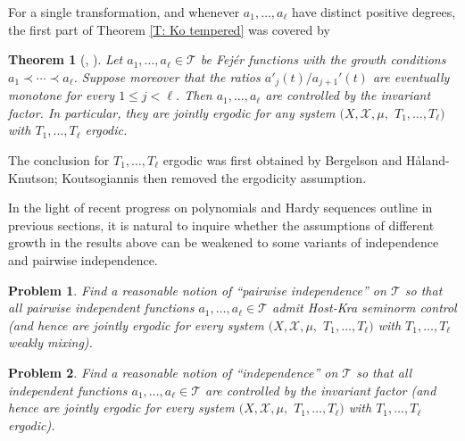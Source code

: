 \documentclass[11pt]{amsart}
\newtheorem{theorem}[lemma]{Theorem}
\newtheorem{problem}{Problem}
\theoremstyle{definition}
\let\ringaccent\r
\def\aa{\ringaccent a}
\def\aa{\ringaccent a}
\newcommand{\CT}{{\mathcal T}}
\newcommand{\CX}{{\mathcal X}}
\renewcommand{\r}{{\mathbf{r}}}
\newcommand{\1}{{\mathbf{1}}}
\newcommand{\BK}[1]{{\color{Apricot}{{#1}}}}
\begin{document}
For a single transformation, and whenever $a_1, \ldots, a_\ell$ have distinct positive degrees, the first part of Theorem \ref{T: Ko tempered} was covered by \cite[Corollary 5.14(iii)]{BeHK09}

\begin{theorem}[{\cite[Theorem 2.4]{Kouts21}, \cite[Theorem 7.3]{BeHK09}}]
    Let $a_1, \ldots, a_\ell\in \CT$ be Fej\'er functions with the growth conditions $a_1 \prec \cdots \prec a_\ell$. Suppose moreover that the ratios $a'_j(t)/a_{j+1}'(t)$ are eventually monotone for every $1\leq j < \ell$. Then $a_1, \ldots, a_\ell$ are controlled by the invariant factor. %
    In particular, they are jointly ergodic for any system $(X, \CX, \mu,$\! $T_1, \ldots, T_\ell)$ with $T_1, \ldots, T_\ell$ ergodic. 
\end{theorem}
The conclusion for $T_1, \ldots, T_\ell$ ergodic was first obtained by Bergelson and H{\aa}land-Knutson; Koutsogiannis then removed the ergodicity assumption.

In the light of recent progress on polynomials and Hardy sequences outline in previous sections, it is natural to inquire whether the assumptions of different growth in the results above can be weakened to some variants of independence and pairwise independence. 
\begin{problem}
    Find a reasonable notion of ``pairwise independence'' on $\CT$ so that all pairwise independent functions $a_1, \ldots, a_\ell\in\CT$ admit Host-Kra seminorm control (and hence are jointly ergodic for every system $(X, \CX, \mu,$\! $T_1, \ldots, T_\ell)$ with $T_1, \ldots, T_\ell$ weakly mixing).
\end{problem}
\begin{problem}
    Find a reasonable notion of ``independence'' on $\CT$ so that all independent functions $a_1, \ldots, a_\ell\in\CT$ are controlled by the invariant factor (and hence are jointly ergodic for every system $(X, \CX, \mu,$\! $T_1, \ldots, T_\ell)$ with $T_1, \ldots, T_\ell$ ergodic).
\end{problem}
\end{document}
